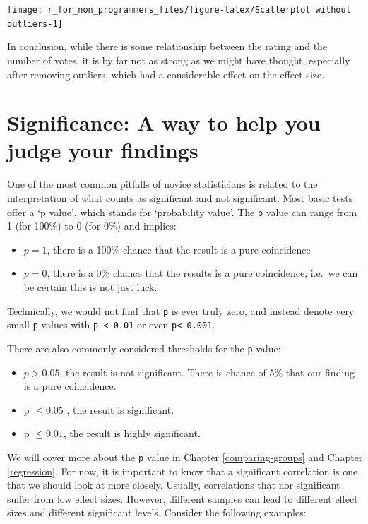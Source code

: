 \documentclass[
]{book}
\begin{document}
\begin{center}\texttt{[image: r\_for\_non\_programmers\_files/figure-latex/Scatterplot without outliers-1]} \end{center}

In conclusion, while there is some relationship between the rating and the number of votes, it is by far not as strong as we might have thought, especially after removing outliers, which had a considerable effect on the effect size.

\hypertarget{significance}{%
\section{Significance: A way to help you judge your findings}\label{significance}}

One of the most common pitfalls of novice statisticians is related to the interpretation of what counts as significant and not significant. Most basic tests offer a `p value', which stands for `probability value'. The \texttt{p} value can range from 1 (for 100\%) to 0 (for 0\%) and implies:

\begin{itemize}
\item
  \(p = 1\), there is a 100\% chance that the result is a pure coincidence
\item
  \(p = 0\), there is a 0\% chance that the results is a pure coincidence, i.e.~we can be certain this is not just luck.
\end{itemize}

Technically, we would not find that \texttt{p} is ever truly zero, and instead denote very small \texttt{p} values with \texttt{p\ \textless{}\ 0.01} or even \texttt{p\textless{}\ 0.001}.

There are also commonly considered thresholds for the \texttt{p} value:

\begin{itemize}
\item
  \(p > 0.05\), the result is not significant. There is chance of 5\% that our finding is a pure coincidence.
\item
  p \(\leq 0.05\) , the result is significant.
\item
  p \(\leq 0.01\), the result is highly significant.
\end{itemize}

We will cover more about the \texttt{p} value in Chapter \ref{comparing-groups} and Chapter \ref{regression}. For now, it is important to know that a significant correlation is one that we should look at more closely. Usually, correlations that nor significant suffer from low effect sizes. However, different samples can lead to different effect sizes and different significant levels. Consider the following examples:
\end{document}
